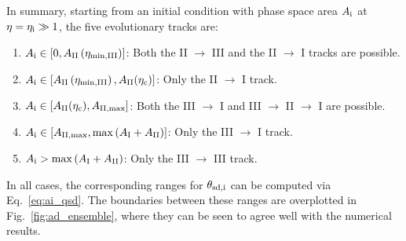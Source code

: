 \documentclass[twocolumn,twocolappendix]{aastex63}
\newcommand*{\p}[1]{\left(#1\right)}
\newcommand*{\s}[1]{\left[#1\right]}
\begin{document}
In summary, starting from an initial condition with phase space area $A_{\rm i}$
at $\eta = \eta_{\rm i} \gg 1$, the five evolutionary tracks are:
\begin{enumerate}
    \item $A_{\rm i} \in \s{0, A_{\rm II}\p{\eta_{\rm \min, III}}}$: Both the II
        $\to$ III and the II $\to$ I tracks are possible.

    \item $A_{\rm i} \in \s{A_{\rm II}\p{\eta_{\rm \min, III}}, A_{\rm
        II}(\eta_{\rm c})}$: Only the II $\to$ I track.

    \item $A_{\rm i} \in \s{A_{\rm II}(\eta_{\rm c}), A_{\rm II, \max}}$:
        Both the III $\to$ I and III $\to$ II $\to$ I are possible.

    \item $A_{\rm i} \in \s{A_{\rm II, \max}, \max \p{A_{\rm I} + A_{\rm II}}}$:
        Only the III $\to$ I track.

    \item $A_{\rm i} > \max \p{A_{\rm I} + A_{\rm II}}$: Only the III $\to$ III
        track.
\end{enumerate}
In all cases, the corresponding ranges for $\theta_{\rm sd,i}$ can be computed via
Eq.~\eqref{eq:ai_qsd}. The boundaries between these ranges are overplotted in
Fig.~\ref{fig:ad_ensemble}, where they can be seen to agree well with the
numerical results.
\end{document}
